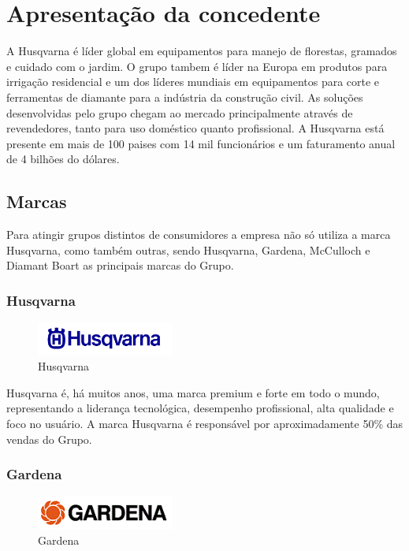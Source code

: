 \documentclass[12pt]{article}
\begin{document}
\section{Apresentação da concedente}

A Husqvarna é líder global em equipamentos para manejo de florestas, gramados e cuidado com o jardim. O grupo tambem é líder na Europa em produtos para irrigação residencial e um dos líderes mundiais em equipamentos para corte e ferramentas de diamante para a indústria da construção civil. As soluções desenvolvidas pelo grupo chegam ao mercado principalmente através de revendedores, tanto para uso doméstico quanto profissional. A Husqvarna está presente em mais de 100 paises com 14 mil funcionários e um faturamento anual de 4 bilhões do dólares.

\subsection{Marcas}
	Para atingir grupos distintos de consumidores a empresa não só utiliza a marca Husqvarna, como também outras, sendo Husqvarna, Gardena, McCulloch e Diamant Boart as principais marcas do Grupo.

\subsubsection{Husqvarna}

\begin{figure}[h!]
	\centering
	\includegraphics[width=0.4\textwidth]{img/logo-husqvarna.png}
	\caption{Husqvarna}
\end{figure}

	Husqvarna é, há muitos anos, uma marca premium e forte em todo o mundo, representando a liderança tecnológica, desempenho profissional, alta qualidade e foco no usuário. A marca Husqvarna é responsável por aproximadamente 50\% das vendas do Grupo.

\subsubsection{Gardena}

\begin{figure}[h!]
	\centering
	\includegraphics[width=0.4\textwidth]{img/logo-gardena.png}
	\caption{Gardena}
\end{figure}
\end{document}
